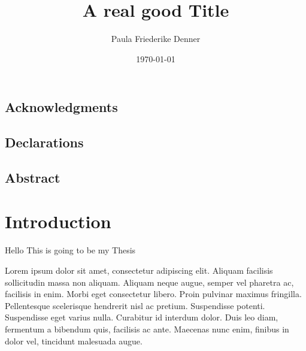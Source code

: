 \documentclass[a4paper, 11pt]{report}
\date{\today}
\author{Paula Friederike Denner}
\title{A real good Title}
\begin{document}

\thesistitlepage




\pagestyle{plain}


\tableofcontents{}


\listoffigures{}


\listoftables{}

\clearpage

\section*{Acknowledgments}


\clearpage

\section*{Declarations}


\clearpage
\null\vfill

{\centering
\section*{Abstract}
}


\vfill\vfill
\clearpage



\chapter{Introduction}


Hello This is going to be my Thesis\cite{aBook}

Lorem ipsum dolor sit amet, consectetur adipiscing elit. Aliquam facilisis sollicitudin massa non aliquam. Aliquam neque augue, semper vel pharetra ac, facilisis in enim. Morbi eget consectetur libero. Proin pulvinar maximus fringilla. Pellentesque scelerisque hendrerit nisl ac pretium. Suspendisse potenti. Suspendisse eget varius nulla. Curabitur id interdum dolor. Duis leo diam, fermentum a bibendum quis, facilisis ac ante. Maecenas nunc enim, finibus in dolor vel, tincidunt malesuada augue.
\end{document}
